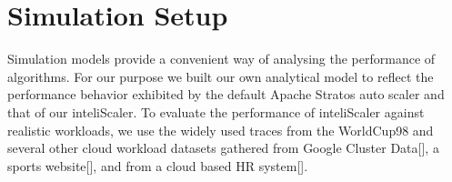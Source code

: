 \section{Simulation Setup}
Simulation models provide a convenient way of analysing the performance of algorithms. For our purpose we built our own analytical model to reflect the performance behavior exhibited by the default Apache Stratos auto scaler and that of our inteliScaler. To evaluate the performance of inteliScaler against realistic workloads, we use the widely used traces from the WorldCup98\cite{website:worldcup} and several other cloud workload datasets gathered from Google Cluster Data[], a sports website[], and from a cloud based HR system[]. \\